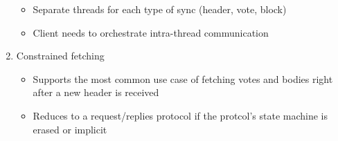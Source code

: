 \documentclass[10pt]{article}
\providecommand{\tightlist}{%
  \setlength{\itemsep}{0pt}\setlength{\parskip}{0pt}}
\begin{document}
\begin{enumerate}
  \begin{itemize}
  \tightlist
  \item
    Separate threads for each type of sync (header, vote, block)
  \item
    Client needs to orchestrate intra-thread communication
  \end{itemize}
\item
  Constrained fetching

  \begin{itemize}
  \tightlist
  \item
    Supports the most common use case of fetching votes and bodies right
    after a new header is received
  \item
    Reduces to a request/replies protocol if the protcol's state machine
    is erased or implicit
  \end{itemize}
\end{enumerate}
\end{document}
